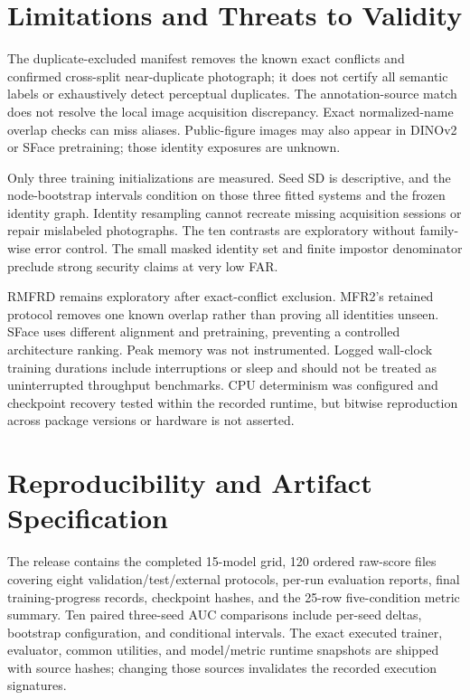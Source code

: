 \documentclass[12pt,a4paper,oneside]{report}
\begin{document}
\chapter{Limitations and Threats to Validity}
The duplicate-excluded manifest removes the known exact conflicts and confirmed cross-split near-duplicate photograph; it does not certify all semantic labels or exhaustively detect perceptual duplicates. The annotation-source match does not resolve the local image acquisition discrepancy. Exact normalized-name overlap checks can miss aliases. Public-figure images may also appear in DINOv2 or SFace pretraining; those identity exposures are unknown.

Only three training initializations are measured. Seed SD is descriptive, and the node-bootstrap intervals condition on those three fitted systems and the frozen identity graph. Identity resampling cannot recreate missing acquisition sessions or repair mislabeled photographs. The ten contrasts are exploratory without family-wise error control. The small masked identity set and finite impostor denominator preclude strong security claims at very low FAR.

RMFRD remains exploratory after exact-conflict exclusion. MFR2's retained protocol removes one known overlap rather than proving all identities unseen. SFace uses different alignment and pretraining, preventing a controlled architecture ranking. Peak memory was not instrumented. Logged wall-clock training durations include interruptions or sleep and should not be treated as uninterrupted throughput benchmarks. CPU determinism was configured and checkpoint recovery tested within the recorded runtime, but bitwise reproduction across package versions or hardware is not asserted.

\chapter{Reproducibility and Artifact Specification}
The release contains the completed 15-model grid, 120 ordered raw-score files covering eight validation/test/external protocols, per-run evaluation reports, final training-progress records, checkpoint hashes, and the 25-row five-condition metric summary. Ten paired three-seed AUC comparisons include per-seed deltas, bootstrap configuration, and conditional intervals. The exact executed trainer, evaluator, common utilities, and model/metric runtime snapshots are shipped with source hashes; changing those sources invalidates the recorded execution signatures.
\end{document}
